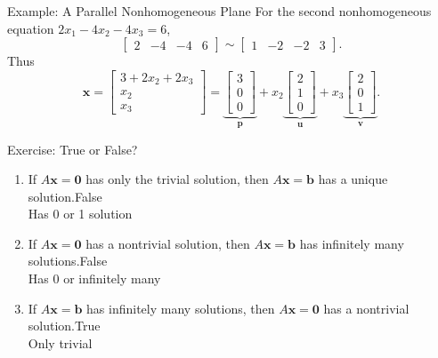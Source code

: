 \begin{frame}{Example: A Parallel Nonhomogeneous Plane}
  For the second nonhomogeneous equation $2x_1-4x_2-4x_3=6$,
  \[
    \begin{bmatrix}2&-4&-4&6\end{bmatrix}
    \sim\begin{bmatrix}1&-2&-2&3\end{bmatrix}.
  \]
  Thus
  \[
    \mathbf{x}
    =\begin{bmatrix}3+2x_2+2x_3\\x_2\\x_3\end{bmatrix}
    =\underbrace{\begin{bmatrix}3\\0\\0\end{bmatrix}}_{\mathbf{p}}
     +x_2\underbrace{\begin{bmatrix}2\\1\\0\end{bmatrix}}_{\mathbf{u}}
     +x_3\underbrace{\begin{bmatrix}2\\0\\1\end{bmatrix}}_{\mathbf{v}}.
  \]
\end{frame}

\begin{frame}{Exercise: True or False?}
  \small
  \begin{enumerate}
    \item If $A\mathbf{x}=\mathbf{0}$ has only the trivial solution, then
          $A\mathbf{x}=\mathbf{b}$ has a unique solution.\pause \alert{False} \\Has 0 or 1 solution
    \item If $A\mathbf{x}=\mathbf{0}$ has a nontrivial solution, then
          $A\mathbf{x}=\mathbf{b}$ has infinitely many solutions.\pause \alert{False}\\ Has 0 or infinitely many
    \item If $A\mathbf{x}=\mathbf{b}$ has infinitely many solutions, then
          $A\mathbf{x}=\mathbf{0}$ has a nontrivial solution.\pause \alert{True} \\Only trivial 
  \end{enumerate}
\end{frame}


